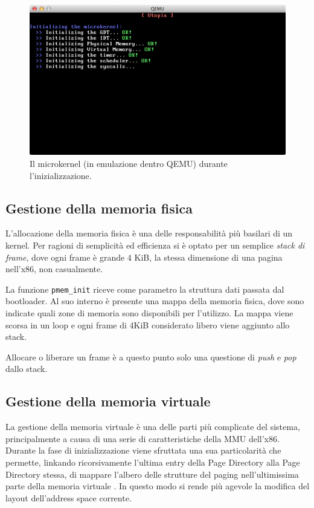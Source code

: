 \documentclass[12pt,a4paper]{report}
\begin{document}
			\begin{figure}[htbp]
			\centering
			\includegraphics[scale=0.55]{img/boot.png}
			\caption{Il microkernel (in emulazione dentro QEMU) durante l'inizializzazione.\label{fig:boot}}
			\end{figure}
		
		\subsection{Gestione della memoria fisica}
			L'allocazione della memoria fisica è una delle responsabilità più basilari di un kernel.
			Per ragioni di semplicità ed efficienza si è optato per un semplice \emph{stack di frame},
			dove ogni frame è grande 4 KiB, la stessa dimensione di una pagina nell'x86, non casualmente.
			
			
			
			La funzione \texttt{pmem\_init} riceve come parametro la struttura dati passata dal bootloader.
			Al suo interno è presente una mappa della memoria fisica, dove sono indicate quali
			zone di memoria sono disponibili per l'utilizzo. La mappa viene scorsa in un loop
			e ogni frame di 4KiB considerato libero viene aggiunto allo stack.
			
			Allocare o liberare un frame è a questo punto solo una questione di \emph{push} e \emph{pop} dallo stack.
			
		\subsection{Gestione della memoria virtuale}
			La gestione della memoria virtuale è una delle parti più complicate del sistema, principalmente
			a causa di una serie di caratteristiche della MMU dell'x86.
			Durante la fase di inizializzazione viene sfruttata una sua particolarità che permette,
			linkando ricorsivamente l'ultima entry della Page Directory alla Page Directory stessa,
			di mappare l'albero delle strutture del paging nell'ultimissima parte della memoria
			virtuale \cite{OSDEV_MMU}.
			In questo modo si rende più agevole la modifica del layout dell'address space corrente.
			
\end{document}
